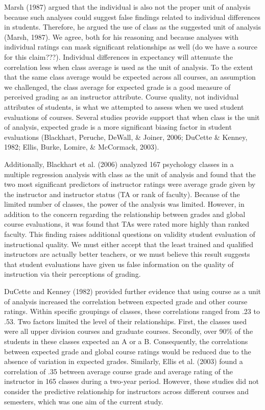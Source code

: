 \documentclass[man]{apa6}
\theoremstyle{definition}
\theoremstyle{definition}
\theoremstyle{definition}
\theoremstyle{remark}
\begin{document}
Marsh (1987) argued that the individual is also not the proper unit of
analysis because such analyses could suggest false findings related to
individual differences in students. Therefore, he argued the use of
class as the suggested unit of analysis (Marsh, 1987). We agree, both
for his reasoning and because analyses with individual ratings can mask
significant relationships as well (do we have a source for this
claim???). Individual differences in expectancy will attenuate the
correlation less when class average is used as the unit of analysis. To
the extent that the same class average would be expected across all
courses, an assumption we challenged, the class average for expected
grade is a good measure of perceived grading as an instructor attribute.
Course quality, not individual attributes of students, is what we
attempted to assess when we used student evaluations of courses. Several
studies provide support that when class is the unit of analysis,
expected grade is a more significant biasing factor in student
evaluations (Blackhart, Peruche, DeWall, \& Joiner, 2006; DuCette \&
Kenney, 1982; Ellis, Burke, Lomire, \& McCormack, 2003).

Additionally, Blackhart et al. (2006) analyzed 167 psychology classes in
a multiple regression analysis with class as the unit of analysis and
found that the two most significant predictors of instructor ratings
were average grade given by the instructor and instructor status (TA or
rank of faculty). Because of the limited number of classes, the power of
the analysis was limited. However, in addition to the concern regarding
the relationship between grades and global course evaluations, it was
found that TAs were rated more highly than ranked faculty. This finding
raises additional questions on validity student evaluation of
instructional quality. We must either accept that the least trained and
qualified instructors are actually better teachers, or we must believe
this result suggests that student evaluations have given us false
information on the quality of instruction via their perceptions of
grading.

DuCette and Kenney (1982) provided further evidence that using course as
a unit of analysis increased the correlation between expected grade and
other course ratings. Within specific groupings of classes, these
correlations ranged from .23 to .53. Two factors limited the level of
their relationships. First, the classes used were all upper division
courses and graduate courses. Secondly, over 90\% of the students in
these classes expected an A or a B. Consequently, the correlations
between expected grade and global course ratings would be reduced due to
the absence of variation in expected grades. Similarly, Ellis et al.
(2003) found a correlation of .35 between average course grade and
average rating of the instructor in 165 classes during a two-year
period. However, these studies did not consider the predictive
relationship for instructors across different courses and semesters,
which was one aim of the current study.
\end{document}
